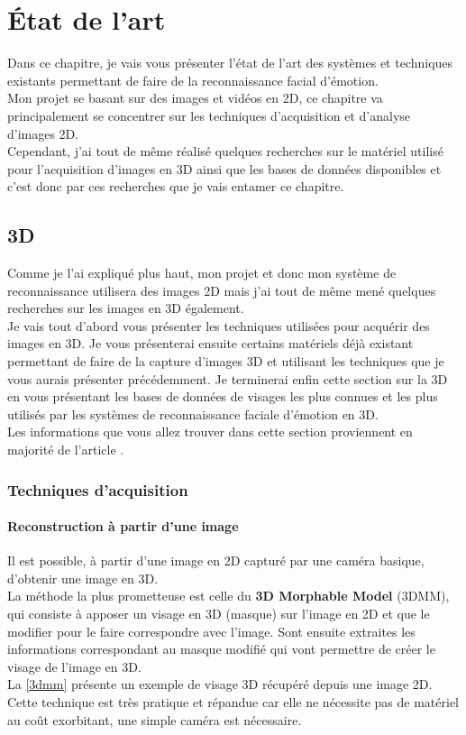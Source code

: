 \documentclass[overfullbox, poster]{polytech/polytech}
\begin{document}
\chapter{État de l'art}
\label{chap1_2}

Dans ce chapitre, je vais vous présenter l'état de l'art des systèmes et techniques existants permettant de faire de la reconnaissance facial d'émotion.\\
Mon projet se basant sur des images et vidéos en 2D, ce chapitre va principalement se concentrer sur les techniques d'acquisition et d'analyse d'images 2D.\\
Cependant, j'ai tout de même réalisé quelques recherches sur le matériel utilisé pour l'acquisition d'images en 3D ainsi que les bases de données disponibles et c'est donc par ces recherches que je vais entamer ce chapitre.

\newpage
\section{3D}
\label{sec:3d}

Comme je l'ai expliqué plus haut, mon projet et donc mon système de reconnaissance utilisera des images 2D mais j'ai tout de même mené quelques recherches sur les images en 3D également.\\
Je vais tout d'abord vous présenter les techniques utilisées pour acquérir des images en 3D. Je vous présenterai ensuite certains matériels déjà existant permettant de faire de la capture d'images 3D et utilisant les techniques que je vous aurais présenter précédemment. Je terminerai enfin cette section sur la 3D en vous présentant les bases de données de visages les plus connues et les plus utilisés par les systèmes de reconnaissance faciale d'émotion en 3D.\\
Les informations que vous allez trouver dans cette section proviennent en majorité de l'article \cite{sota3d}.

\subsection{Techniques d'acquisition}
\label{subsec:tech}

\subsubsection{Reconstruction à partir d'une image}
\label{single_img_reconstruct}
Il est possible, à partir d'une image en 2D capturé par une caméra basique, d'obtenir une image en 3D.\\
La méthode la plus prometteuse est celle du \textbf{3D Morphable Model} (3DMM), qui consiste à apposer un visage en 3D (masque) sur l'image en 2D et que le modifier pour le faire correspondre avec l'image. Sont ensuite extraites les informations correspondant au masque modifié qui vont permettre de créer le visage de l'image en 3D.\\
La \autoref{3dmm} présente un exemple de visage 3D récupéré depuis une image 2D.\\
Cette technique est très pratique et répandue car elle ne nécessite pas de matériel au coût exorbitant, une simple caméra est nécessaire.
\end{document}
